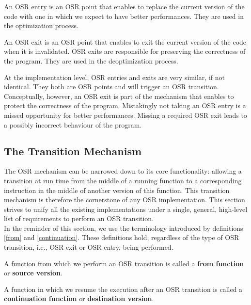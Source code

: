 \begin{definition}\label{OSREntryDefinition}
An OSR entry is an OSR point that enables to replace the current version of the code with one in which we expect to have better performances.
They are used in the optimization process.
\end{definition}

\begin{definition}
An OSR exit is an OSR point that enables to exit the current version of the code when it is invalidated.
OSR exits are responsible for preserving the correctness of the program.
They are used in the deoptimization process.
\end{definition}

At the implementation level, OSR entries and exits are very similar, if not identical. 
They both are OSR points and will trigger an OSR transition.
Conceptually, however, an OSR exit is part of the mechanism that enables to protect the correctness of the program.
Mistakingly not taking an OSR entry is a missed opportunity for better performances.
Missing a required OSR exit leads to a possibly incorrect behaviour of the program.\\

\subsection{The Transition Mechanism}
The OSR mechanism can be narrowed down to its core functionality: allowing a transition at run time from the middle of a running function to a corresponding instruction in the middle of another version of this function.
This transition mechanism is therefore the cornerstone of any OSR implementation.
This section strives to unify all the existing implementations under a single, general, high-level list of requirements to perform an OSR transition.\\

In the reminder of this section, we use the terminology introduced by definitions \ref{from} and \ref{continuation}.
These definitions hold, regardless of the type of OSR transition, i.e., OSR exit or OSR entry, being performed.

\begin{definition}\label{from}
A function from which we perform an OSR transition is called a \textbf{from function} or \textbf{source version}.
\end{definition}

\begin{definition}\label{continuation}
A function in which we resume the execution after an OSR transition is called a \textbf{continuation function} or \textbf{destination version}.
\end{definition}

